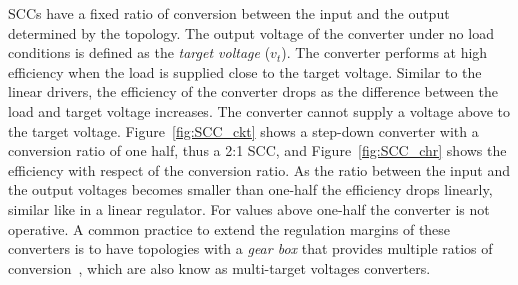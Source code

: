 SCCs have a fixed ratio of conversion between the input and the output determined by the topology. The output voltage of the converter under no load conditions is defined as the \emph{target voltage} ($v_t$). The converter performs at high efficiency when the load is supplied close to the target voltage. Similar to the linear drivers, the efficiency of the converter drops as the difference between the load and target voltage increases. The converter cannot supply a voltage above to the target voltage. Figure~\ref{fig:SCC_ckt} shows a step-down converter with a conversion ratio of one half, thus a 2:1 SCC, and Figure~\ref{fig:SCC_chr} shows the efficiency with respect of the conversion ratio. As the ratio between the input and the output voltages becomes smaller than one-half the efficiency drops linearly, similar like in a linear regulator. For values above one-half the converter is not operative.  A common practice to extend the regulation margins of these converters is to have topologies with a \emph{gear box} that provides multiple ratios of conversion~\cite{2013Ma,2013Breussegem:m_trg}, which are also know as multi-target voltages converters.


